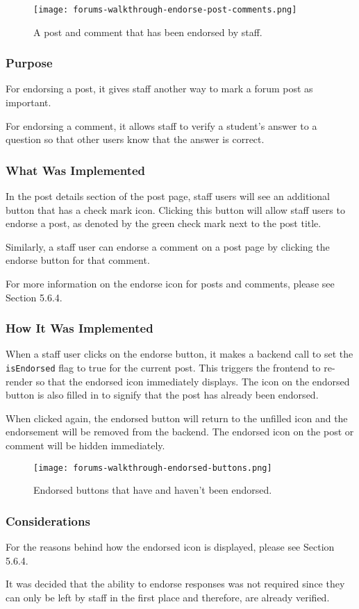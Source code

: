 \begin{figure}[h!]
    \texttt{[image: forums-walkthrough-endorse-post-comments.png]}
    \centering
    \caption{A post and comment that has been endorsed by staff.}
\end{figure}

\subsubsection{Purpose}
For endorsing a post, it gives staff another way to mark a forum post as important.

For endorsing a comment, it allows staff to verify a student's answer to a question so that other users know that the answer is correct.

\subsubsection{What Was Implemented}
In the post details section of the post page, staff users will see an additional button that has a check mark icon.
Clicking this button will allow staff users to endorse a post, as denoted by the green check mark next to the post title.

Similarly, a staff user can endorse a comment on a post page by clicking the endorse button for that comment.

For more information on the endorse icon for posts and comments, please see Section 5.6.4.

\subsubsection{How It Was Implemented}
When a staff user clicks on the endorse button, it makes a backend call to set the \texttt{isEndorsed} flag to true for the current post.
This triggers the frontend to re-render so that the endorsed icon immediately displays.
The icon on the endorsed button is also filled in to signify that the post has already been endorsed.

When clicked again, the endorsed button will return to the unfilled icon and the endorsement will be removed from the backend.
The endorsed icon on the post or comment will be hidden immediately.

\begin{figure}[h!]
    \texttt{[image: forums-walkthrough-endorsed-buttons.png]}
    \centering
    \caption{Endorsed buttons that have and haven't been endorsed.}
\end{figure}

\subsubsection{Considerations}
For the reasons behind how the endorsed icon is displayed, please see Section 5.6.4.

It was decided that the ability to endorse responses was not required since they can only be left by staff in the first place and therefore, are already verified.